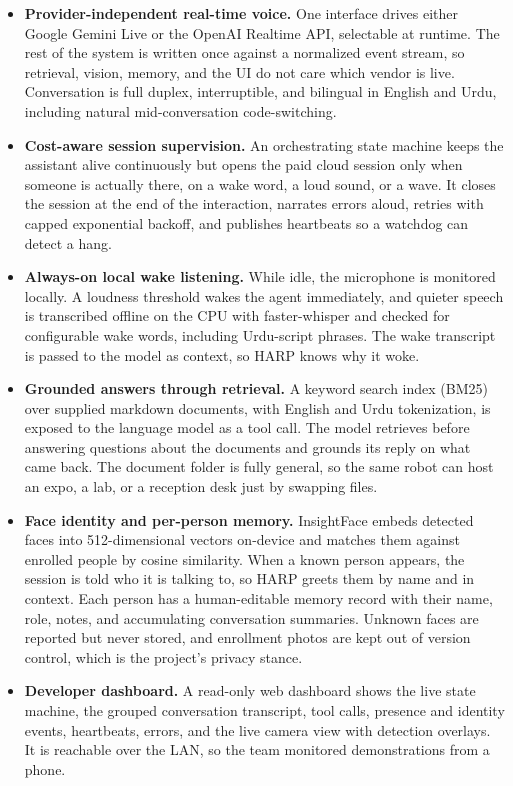 \documentclass[11pt,a4paper]{article}
\begin{document}
\begin{itemize}
\item \textbf{Provider-independent real-time voice.} One interface drives either Google Gemini Live or the OpenAI Realtime API, selectable at runtime. The rest of the system is written once against a normalized event stream, so retrieval, vision, memory, and the UI do not care which vendor is live. Conversation is full duplex, interruptible, and bilingual in English and Urdu, including natural mid-conversation code-switching.
\item \textbf{Cost-aware session supervision.} An orchestrating state machine keeps the assistant alive continuously but opens the paid cloud session only when someone is actually there, on a wake word, a loud sound, or a wave. It closes the session at the end of the interaction, narrates errors aloud, retries with capped exponential backoff, and publishes heartbeats so a watchdog can detect a hang.
\item \textbf{Always-on local wake listening.} While idle, the microphone is monitored locally. A loudness threshold wakes the agent immediately, and quieter speech is transcribed offline on the CPU with faster-whisper and checked for configurable wake words, including Urdu-script phrases. The wake transcript is passed to the model as context, so HARP knows why it woke.
\item \textbf{Grounded answers through retrieval.} A keyword search index (BM25) over supplied markdown documents, with English and Urdu tokenization, is exposed to the language model as a tool call. The model retrieves before answering questions about the documents and grounds its reply on what came back. The document folder is fully general, so the same robot can host an expo, a lab, or a reception desk just by swapping files.
\item \textbf{Face identity and per-person memory.} InsightFace embeds detected faces into 512-dimensional vectors on-device and matches them against enrolled people by cosine similarity. When a known person appears, the session is told who it is talking to, so HARP greets them by name and in context. Each person has a human-editable memory record with their name, role, notes, and accumulating conversation summaries. Unknown faces are reported but never stored, and enrollment photos are kept out of version control, which is the project's privacy stance.
\item \textbf{Developer dashboard.} A read-only web dashboard shows the live state machine, the grouped conversation transcript, tool calls, presence and identity events, heartbeats, errors, and the live camera view with detection overlays. It is reachable over the LAN, so the team monitored demonstrations from a phone.
\end{itemize}
\end{document}
